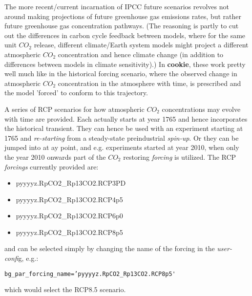The more recent/current incarnation of IPCC future scenarios revolves not around  making projections of future greenhouse gas emissions rates, but rather future greenhouse gas concentration pathways. (The reasoning is partly to cut out the differences in carbon cycle feedback between models, where for the same unit \(CO_{2}\) release, different climate/Earth system models might project a different atmospheric \(CO_{2}\) concentration and hence climate change (in addition to differences between models in climate sensitivity).) In \textbf{cookie}, these work pretty well much like in the historical forcing scenario, where the observed change in atmospheric \(CO_{2}\) concentration in the atmosphere with time, is prescribed and the model 'forced' to conform to this trajectory.

\vspace{1mm}

A series of RCP scenarios for how atmospheric \(CO_{2}\) concentrations may evolve with time are provided. Each actually starts at year 1765 and hence incorporates the historical transient. They can hence be used with an experiment starting at 1765 and \textit{re-starting} from a steady-state preindustrial \textit{spin-up}. Or they can be jumped into at ay point, and e.g. experiments started at year 2010, when only the year 2010 onwards part of the \(CO_{2}\) restoring \textit{forcing} is utilized. The RCP \textit{forcings} currently provided are:

\vspace{1mm}
\begin{itemize}[noitemsep]
\setlength{\itemindent}{.2in}
\item \textsf{\footnotesize pyyyyz.RpCO2\_Rp13CO2.RCP3PD}
\item \textsf{\footnotesize pyyyyz.RpCO2\_Rp13CO2.RCP4p5}
\item \textsf{\footnotesize pyyyyz.RpCO2\_Rp13CO2.RCP6p0}
\item \textsf{\footnotesize pyyyyz.RpCO2\_Rp13CO2.RCP8p5}
\end{itemize}
\vspace{2mm}
and can be selected simply by changing the name of the forcing in the \textit{user-confi}g, e.g.:
\vspace{-2pt}\small\begin{verbatim}
bg_par_forcing_name=’pyyyyz.RpCO2_Rp13CO2.RCP8p5'
\end{verbatim}\normalsize\vspace{-2pt}
\noindent which would select the RCP8.5 scenario.

